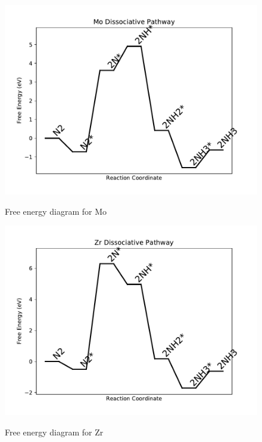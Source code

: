 \documentclass[journal=jacsat,manuscript=article]{achemso}
\begin{document}
\begin{figure}
\includegraphics[width=1\linewidth]{data/plots/Mo_dissociative.pdf}
\label{fig:Mo_dissociative}
\caption{Free energy diagram for Mo}
\end{figure}

\newpage
\begin{figure}
\includegraphics[width=1\linewidth]{data/plots/Zr_dissociative.pdf}
\label{fig:Zr_dissociative}
\caption{Free energy diagram for Zr}
\end{figure}
\end{document}
